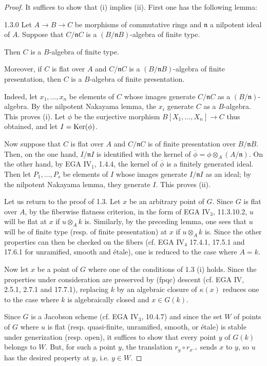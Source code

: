 \begin{proof}
It suffices to show that (i) implies (ii). First one has the following lemma:
\begin{lemma}{1.3.0}\label{VIB.1.3.0}
Let $A\to B\to C$ be morphisms of commutative rings and $\mathfrak n$ a nilpotent ideal of $A$. Suppose that $C/\mathfrak nC$ is a $(B/\mathfrak nB)$-algebra of finite type.
\begin{enumeratei}
\item Then $C$ is a $B$-algebra of finite type.
\item Moreover, if $C$ is flat over $A$ and $C/\mathfrak nC$ is a $(B/\mathfrak nB)$-algebra of finite presentation, then $C$ is a $B$-algebra of finite presentation.
\end{enumeratei}
\end{lemma}
Indeed, let $x_1,\ldots,x_n$ be elements of $C$ whose images generate $C/\mathfrak nC$ as a $(B/\mathfrak n)$-algebra. By the nilpotent Nakayama lemma, the $x_i$ generate $C$ as a $B$-algebra. This proves (i). Let $\phi$ be the surjective morphism $B[X_1,\ldots,X_n]\to C$ thus obtained, and let $I=\operatorname{Ker}(\phi)$.

Now suppose that $C$ is flat over $A$ and $C/\mathfrak nC$ is of finite presentation over $B/\mathfrak nB$. Then, on the one hand, $I/\mathfrak nI$ is identified with the kernel of $\overline\phi=\phi\otimes_A(A/\mathfrak n)$. On the other hand, by EGA IV$_1$, 1.4.4, the kernel of $\overline\phi$ is a finitely generated ideal. Then let $P_1,\ldots,P_s$ be elements of $I$ whose images generate $I/\mathfrak nI$ as an ideal; by the nilpotent Nakayama lemma, they generate $I$. This proves (ii).

Let us return to the proof of 1.3. Let $x$ be an arbitrary point of $G$. Since $G$ is flat over $A$, by the fiberwise flatness criterion, in the form of EGA IV$_3$, 11.3.10.2, $u$ will be flat at $x$ if $u\otimes_Ak$ is. Similarly, by the preceding lemma, one sees that $u$ will be of finite type (resp. of finite presentation) at $x$ if $u\otimes_Ak$ is. Since the other properties can then be checked on the fibers (cf. EGA IV$_4$ 17.4.1, 17.5.1 and 17.6.1 for unramified, smooth and étale), one is reduced to the case where $A=k$.

Now let $x$ be a point of $G$ where one of the conditions of 1.3 (i) holds. Since the properties under consideration are preserved by (fpqc) descent (cf. EGA IV, 2.5.1, 2.7.1 and 17.7.1), replacing $k$ by an algebraic closure of $\kappa(x)$ reduces one to the case where $k$ is algebraically closed and $x\in G(k)$.

Since $G$ is a Jacobson scheme (cf. EGA IV$_3$, 10.4.7) and since the set $W$ of points of $G$ where $u$ is flat (resp. quasi-finite, unramified, smooth, or étale) is stable under generization (resp. open), it suffices to show that every point $y$ of $G(k)$ belongs to $W$. But, for such a point $y$, the translation $r_y\circ r_{x^{-1}}$ sends $x$ to $y$, so $u$ has the desired property at $y$, i.e. $y\in W$.
\end{proof}
